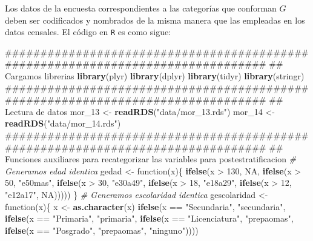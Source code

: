 \documentclass[]{article}
\newenvironment{Shaded}{\begin{snugshade}}{\end{snugshade}}
\newcommand{\KeywordTok}[1]{\textcolor[rgb]{0.13,0.29,0.53}{\textbf{{#1}}}}
\newcommand{\DecValTok}[1]{\textcolor[rgb]{0.00,0.00,0.81}{{#1}}}
\newcommand{\StringTok}[1]{\textcolor[rgb]{0.31,0.60,0.02}{{#1}}}
\newcommand{\CommentTok}[1]{\textcolor[rgb]{0.56,0.35,0.01}{\textit{{#1}}}}
\newcommand{\OtherTok}[1]{\textcolor[rgb]{0.56,0.35,0.01}{{#1}}}
\newcommand{\NormalTok}[1]{{#1}}
\begin{document}
Los datos de la encuesta correspondientes a las categorías que conforman
$G$ deben ser codificados y nombrados de la misma manera que las
empleadas en los datos censales. El código en \texttt{R} es como sigue:

\begin{Shaded}
\begin{Highlighting}[]
\NormalTok{################################################################################}
\NormalTok{## Cargamos librerias}
\KeywordTok{library}\NormalTok{(plyr)}
\KeywordTok{library}\NormalTok{(dplyr)}
\KeywordTok{library}\NormalTok{(tidyr)}
\KeywordTok{library}\NormalTok{(stringr)}
\NormalTok{################################################################################}
\NormalTok{## Lectura de datos}
\NormalTok{mor_13 <-}\StringTok{ }\KeywordTok{readRDS}\NormalTok{(}\StringTok{"data/mor_13.rds"}\NormalTok{)}
\NormalTok{mor_14 <-}\StringTok{ }\KeywordTok{readRDS}\NormalTok{(}\StringTok{"data/mor_14.rds"}\NormalTok{)}
\NormalTok{################################################################################}
\NormalTok{## Funciones auxiliares para recategorizar las variables para postestratificacion}
\CommentTok{# Generamos edad identica}
\NormalTok{gedad <-}\StringTok{ }\NormalTok{function(x)\{}
    \KeywordTok{ifelse}\NormalTok{(x >}\StringTok{ }\DecValTok{130}\NormalTok{, }\OtherTok{NA}\NormalTok{,}
           \KeywordTok{ifelse}\NormalTok{(x >}\StringTok{ }\DecValTok{50}\NormalTok{, }\StringTok{"e50mas"}\NormalTok{,}
                  \KeywordTok{ifelse}\NormalTok{(x >}\StringTok{ }\DecValTok{30}\NormalTok{, }\StringTok{"e30a49"}\NormalTok{,}
                         \KeywordTok{ifelse}\NormalTok{(x >}\StringTok{ }\DecValTok{18}\NormalTok{, }\StringTok{"e18a29"}\NormalTok{,}
                                \KeywordTok{ifelse}\NormalTok{(x >}\StringTok{ }\DecValTok{12}\NormalTok{, }\StringTok{"e12a17"}\NormalTok{, }\OtherTok{NA}\NormalTok{)))))}
\NormalTok{\}}
\CommentTok{# Generamos escolaridad identica}
\NormalTok{gescolaridad <-}\StringTok{ }\NormalTok{function(x)\{}
    \NormalTok{x <-}\StringTok{ }\KeywordTok{as.character}\NormalTok{(x)}
    \KeywordTok{ifelse}\NormalTok{(x ==}\StringTok{ "Secundaria"}\NormalTok{, }\StringTok{"secundaria"}\NormalTok{,}
           \KeywordTok{ifelse}\NormalTok{(x ==}\StringTok{ "Primaria"}\NormalTok{, }\StringTok{"primaria"}\NormalTok{,}
                  \KeywordTok{ifelse}\NormalTok{(x ==}\StringTok{ "Licenciatura"}\NormalTok{, }\StringTok{"prepaomas"}\NormalTok{,}
                         \KeywordTok{ifelse}\NormalTok{(x ==}\StringTok{ "Posgrado"}\NormalTok{, }\StringTok{"prepaomas"}\NormalTok{, }\StringTok{"ninguno"}\NormalTok{))))}

\end{Highlighting}
\end{Shaded}
\end{document}
